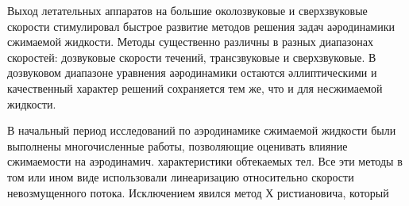 \documentclass[10pt]{article}
\begin{document}
Выход летательных аппаратов на большие околозвуковые и сверхзвуковые скорости стимулировал быстрое развитие методов решения задач аәродинамики сжимаемой жидкости. Методы существенно различны в разных диапазонах скоростей: дозвуковые скорости течений, трансзвуковые и сверхзвуковые. В дозвуковом диапазоне уравнения аәродинамики остаются әллиптическими и качественный характер решений сохраняется тем же, что и для несжимаемой жидкости.



В начальный период исследований по аэродинамике сжимаемой жидкости были выполнены многочисленные работы, позволяющие оценивать влияние сжимаемости на аэродинамич. характеристики обтекаемых тел. Все эти методы в том или ином виде использовали линеаризацию относительно скорости невозмущенного потока. Исключением явился метод Х ристиановича, который
\end{document}
